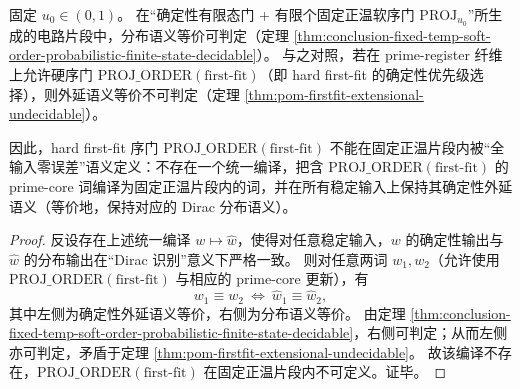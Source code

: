 \begin{theorem}\label{thm:pom-soft-order-fixed-temp-nondefinability}
固定 \(u_0\in(0,1)\)。
在“确定性有限态门 + 有限个固定正温软序门 \(\mathrm{PROJ}_{u_0}\)”所生成的电路片段中，分布语义等价可判定（定理 \ref{thm:conclusion-fixed-temp-soft-order-probabilistic-finite-state-decidable}）。
与之对照，若在 prime-register 纤维上允许硬序门 \(\mathrm{PROJ\_ORDER}(\text{first-fit})\)（即 hard first-fit 的确定性优先级选择），则外延语义等价不可判定（定理 \ref{thm:pom-firstfit-extensional-undecidable}）。

因此，hard first-fit 序门 \(\mathrm{PROJ\_ORDER}(\text{first-fit})\) 不能在固定正温片段内被“全输入零误差”语义定义：不存在一个统一编译，把含 \(\mathrm{PROJ\_ORDER}(\text{first-fit})\) 的 prime-core 词编译为固定正温片段内的词，并在所有稳定输入上保持其确定性外延语义（等价地，保持对应的 Dirac 分布语义）。
\end{theorem}
\begin{proof}
反设存在上述统一编译 \(w\mapsto \widehat w\)，使得对任意稳定输入，\(w\) 的确定性输出与 \(\widehat w\) 的分布输出在“Dirac 识别”意义下严格一致。
则对任意两词 \(w_1,w_2\)（允许使用 \(\mathrm{PROJ\_ORDER}(\text{first-fit})\) 与相应的 prime-core 更新），有
\[
w_1\equiv w_2\ \Longleftrightarrow\ \widehat w_1\equiv \widehat w_2,
\]
其中左侧为确定性外延语义等价，右侧为分布语义等价。
由定理 \ref{thm:conclusion-fixed-temp-soft-order-probabilistic-finite-state-decidable}，右侧可判定；从而左侧亦可判定，矛盾于定理 \ref{thm:pom-firstfit-extensional-undecidable}。
故该编译不存在，\(\mathrm{PROJ\_ORDER}(\text{first-fit})\) 在固定正温片段内不可定义。证毕。
\end{proof}
